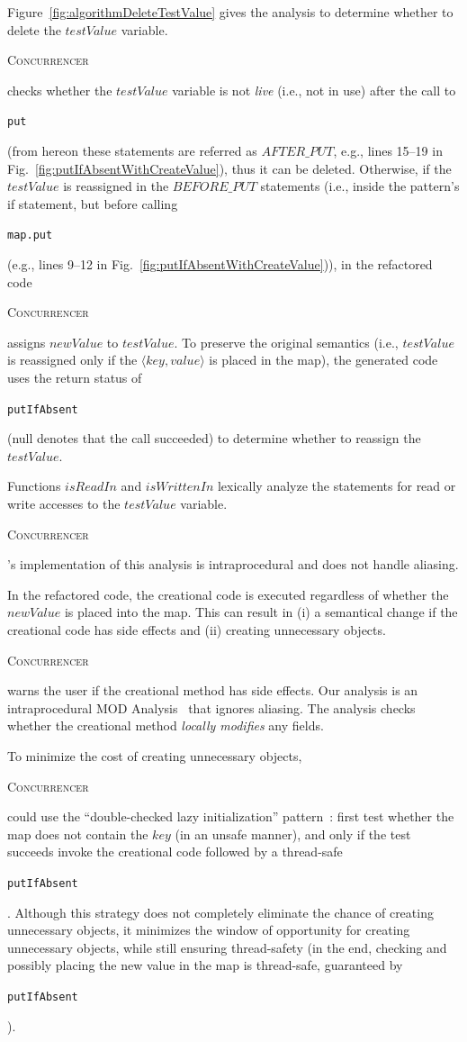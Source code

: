 \documentclass[10pt,twocolumn]{article}
\newcommand{\tool}{\begin{scriptsize}\textsc{Concurrencer}\end{scriptsize}\xspace}
\newcommand{\code}[1]{\begin{smaller}\texttt{#1}\end{smaller}}
\begin{document}
Figure~\ref{fig:algorithmDeleteTestValue} gives the analysis
to determine whether to delete the $\mathit{testValue}$
variable. \tool checks whether the $\mathit{testValue}$ variable is
not \emph{live} (i.e., not in use) after the call to \code{put} (from hereon
these statements are referred as $\mathit{AFTER\_PUT}$,  e.g., lines 15--19 in
Fig.~\ref{fig:putIfAbsentWithCreateValue}), thus it can be deleted. Otherwise, 
if the $\mathit{testValue}$ is reassigned in the $\mathit{BEFORE\_PUT}$
statements (i.e., inside the pattern's if statement, but before calling
\code{map.put} (e.g., lines 9--12 in
Fig.~\ref{fig:putIfAbsentWithCreateValue})), in the refactored code \tool
assigns $\mathit{newValue}$ to $\mathit{testValue}$. To preserve the original
semantics (i.e., $\mathit{testValue}$ is reassigned only if the
$\langle\mathit{key,value}\rangle$ is placed in the map), the generated code
uses the return status of \code{putIfAbsent} (null denotes that the call
succeeded) to determine whether to reassign the $\mathit{testValue}$.


Functions $\mathit{isReadIn}$ and $\mathit{isWrittenIn}$ lexically analyze the
statements for read or write accesses to the $\mathit{testValue}$ variable.
\tool's implementation of this analysis is intraprocedural and does not handle aliasing. 


In the refactored code, the creational code is executed
regardless of whether the $\mathit{newValue}$ is placed into the map. This
can result in (i) a semantical change if the creational code has side effects
and (ii) creating unnecessary objects. 

\tool warns the user if the creational method has side effects. Our analysis is
an intraprocedural MOD Analysis~\cite{Wolfe'96:CompilerTextbook} that ignores
aliasing. The analysis checks whether the creational method \emph{locally
modifies} any fields.



To minimize the cost of creating unnecessary objects, \tool could use the ``double-checked
lazy initialization'' pattern~\cite{DoubleCheckedLazyInitialization}: first test
whether the map does not contain the $\mathit{key}$ (in an unsafe manner), and only if the test succeeds invoke the creational code
followed by a thread-safe \code{putIfAbsent}. Although this strategy does
not completely eliminate the chance of creating unnecessary objects, it
minimizes the window of opportunity for creating unnecessary objects, while
still ensuring thread-safety (in the end, checking and possibly placing the new
value in the map is thread-safe, guaranteed by \code{putIfAbsent}).
\end{document}

